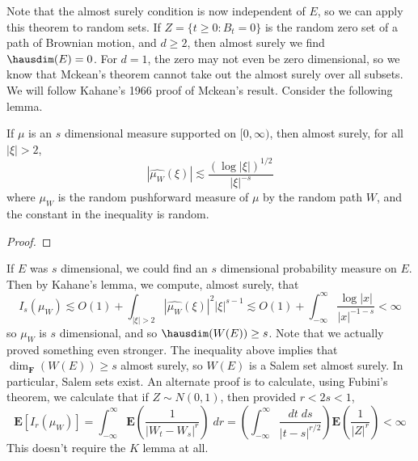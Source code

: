 Note that the almost surely condition is now independent of $E$, so we can apply this theorem to random sets. If $Z = \{ t \geq 0: B_t = 0 \}$ is the random zero set of a path of Brownian motion, and $d \geq 2$, then almost surely we find $\hausdim(E) = 0$. For $d = 1$, the zero may not even be zero dimensional, so we know that Mckean's theorem cannot take out the almost surely over all subsets. We will follow Kahane's 1966 proof of Mckean's result. Consider the following lemma.

\begin{lemma}
	If $\mu$ is an $s$ dimensional measure supported on $[0,\infty)$, then almost surely, for all $|\xi| > 2$,
	\[ |\widehat{\mu_W}(\xi)| \lesssim \frac{(\log |\xi|)^{1/2}}{|\xi|^{-s}} \]
	where $\mu_W$ is the random pushforward measure of $\mu$ by the random path $W$, and the constant in the inequality is random.
\end{lemma}
\begin{proof}
	
\end{proof}

If $E$ was $s$ dimensional, we could find an $s$ dimensional probability measure on $E$. Then by Kahane's lemma, we compute, almost surely, that
%
\[ I_s(\mu_W) \lesssim O(1) + \int_{|\xi| > 2} |\widehat{\mu_W}(\xi)|^2 |\xi|^{s-1} \lesssim O(1) + \int_{-\infty}^\infty \frac{\log |x|}{|x|^{-1-s}} < \infty \]
%
so $\mu_W$ is $s$ dimensional, and so $\hausdim(W(E)) \geq s$. Note that we actually proved something even stronger. The inequality above implies that $\dim_{\mathbf{F}}(W(E)) \geq s$ almost surely, so $W(E)$ is a Salem set almost surely. In particular, Salem sets exist. An alternate proof is to calculate, using Fubini's theorem, we calculate that if $Z \sim N(0,1)$, then provided $r < 2s < 1$,
	\[ \mathbf{E}[I_r(\mu_W)] = \int_{-\infty}^\infty \mathbf{E} \left( \frac{1}{|W_t - W_s|^r} \right)\; dr = \left( \int_{-\infty}^\infty \frac{dt\; ds}{|t-s|^{r/2}} \right) \mathbf{E} \left( \frac{1}{|Z|^r} \right) < \infty \]
	This doesn't require the $K$ lemma at all.

